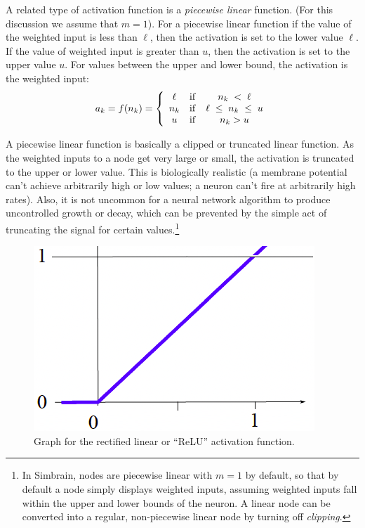 A related type of activation function is a \emph{piecewise linear} function. (For this discussion we assume that $m=1$). For a piecewise linear function if the value of the weighted input is less than $\ell$, then the activation is set to the lower value $\ell$. If the value of weighted input is greater than $u$, then the activation is set to the upper value $u$. For values between the upper and lower bound, the activation is the weighted input:
\begin{eqnarray*}
a_k = f(n_k) =  
\left\{
      \begin{array}{clc}
                  \ell      & {\rm if} &   n_k\; < \; \ell             \\
              n_k  & {\rm if} &  \ell \;\leq\; n_k \;\leq\; u \\
               u     & {\rm if} &    n_k > u
      \end{array} 
\right.
\end{eqnarray*}

A piecewise linear function is basically a clipped or truncated linear function. As the weighted inputs to a node get very large or small, the activation is truncated to the upper or lower value. This is biologically realistic (a membrane potential can't achieve arbitrarily high or low values; a neuron can't fire at arbitrarily high rates). Also, it is not uncommon for a neural network algorithm to produce uncontrolled growth or decay, which can be prevented by the simple act of truncating the signal for certain values.\footnote{In Simbrain, nodes are piecewise linear with $m=1$ by default, so that by default a node simply displays weighted inputs, assuming weighted inputs fall within the upper and lower bounds of the neuron. A linear node can be converted into a regular, non-piecewise linear node by turning off  \emph{clipping}.}

\begin{figure}[h]
\centering
\includegraphics[scale=.4]{./images/relu.png}
\caption[Scott Hotton.]{Graph for the rectified linear or ``ReLU'' activation function.}
\label{relu}
\end{figure}

